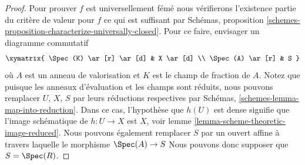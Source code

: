 \begin{proof}

Pour prouver $f$ est universellement fémé nous vérifierons l'existence partie du critère de valeur pour $f$ ce qui est suffisant par Schémas, proposition \ref{schemes-proposition-characterize-universally-closed}. Pour ce faire, envisager un diagramme commutatif
$$
\xymatrix{
\Spec(K) \ar[r] \ar[d] & X \ar[d] \\
\Spec(A) \ar[r] & S
}
$$
où $A$ est un anneau de valorisation et $K$ est le champ de fraction de $A$. Notez que puisque les anneaux d'évaluation et les champs sont réduits, nous pouvons remplacer $U$, $X$, $S$ par leurs réductions respectives par Schémas, \ref{schemes-lemma-map-into-reduction}. Dans ce cas, l'hypothèse que $h(U)$ est dense signifie que l'image schématique de $h : U \to X$ est $X$, voir lemme \ref{lemma-scheme-theoretic-image-reduced}. Nous pouvons également remplacer $S$ par un ouvert affine à travers laquelle le morphisme $\Spec(A) \to S$ Nous pouvons donc supposer que $S = \Spec(R)$.

\medskip\noindent


\end{proof}
